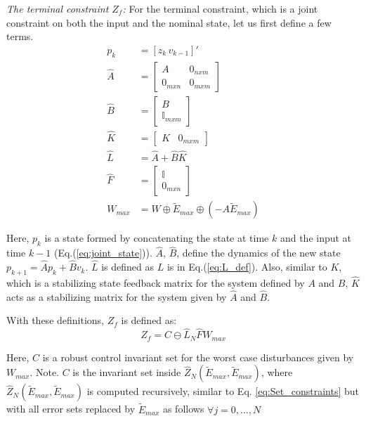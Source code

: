 \textit{The terminal constraint $Z_f$:}
For the terminal constraint, which is a joint constraint on both the input and the nominal state, let us first define a few terms.
\begin{subequations}
\begin{align}
p_k &=[z_k \, v_{k-1}]' \label{eq:joint_state} \\
\hat{A} &= \begin{bmatrix} A & 0_{nxm} \\ 0_{mxn} & 0_{mxm}   \end{bmatrix} \label{eq:A_hat} \\
\hat{B} &= \begin{bmatrix}  B \\ \mathbb{I}_{mxm} \end{bmatrix} \label{eq:B_hat} \\
\hat{K} &= \begin{bmatrix}  K & 0_{mxm}  \end{bmatrix} \label{eq:K_hat} \\
\hat{L} &= \hat{A}+\hat{B}\hat{K} \label{eq:L_hat} \\
\hat{F} &= \begin{bmatrix} \mathbb{I} \\ 0_{mxn} \end{bmatrix} \\
W_{max} &= W \oplus \tilde{E}_{max} \oplus (-A\tilde{E}_{max}) \label{eq:W_max} 
\end{align}
\end{subequations}

Here, $p_k$ is a state formed by concatenating the state at time $k$ and the input at time $k-1$ (Eq.(\ref{eq:joint_state})). $\hat{A}$, $\hat{B}$, define the dynamics of the new state $p_{k+1} = \hat{A}p_{k} + \hat{B}v_k$. $\hat{L}$ is defined as $L$ is in Eq.(\ref{eq:L_def}). Also, similar to $K$, which is a stabilizing state feedback matrix for the system defined by $A$ and $B$, $\hat{K}$ acts as a stabilizing matrix for the system given by $\hat{A}$ and $\hat{B}$.

With these definitions, $Z_f$ is defined as:
\begin{equation}
Z_f = C\ominus \hat{L}_N\hat{F}{W}_{max}
\end{equation}

Here, $C$ is a robust control invariant set for the worst case disturbances given by $W_{max}$. Note. $C$ is the invariant set inside $\hat{Z}_N(\tilde{E}_{max},\tilde{E}_{max})$, where $\hat{Z}_N(\tilde{E}_{max},\tilde{E}_{max})$ is computed recursively, similar to Eq. \ref{eq:Set_constraints} but with all error sets replaced by $\tilde{E}_{max}$ as follows $\forall j=0,\dotsc,N$


